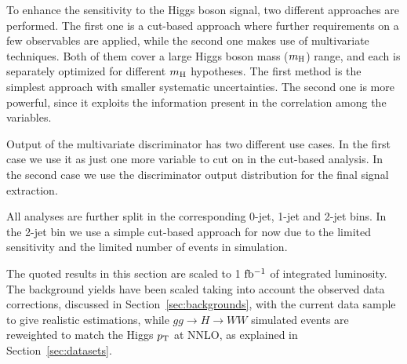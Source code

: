 To enhance the sensitivity to the Higgs boson signal, two different approaches 
are performed. The first one is a cut-based approach where further requirements 
on a few observables are applied, while the second one makes use of
multivariate techniques. Both of them cover a large Higgs boson mass
($m_{\rm{H}}$) range, and each is separately optimized for different
$m_{\rm{H}}$ hypotheses. The first method is the simplest approach with smaller
systematic uncertainties. The second one is
more powerful, since it exploits the information present in the
correlation among the variables. 

Output of the multivariate discriminator has two different use
cases. In the first case we use it as just one more variable to cut on
in the cut-based analysis. In the second case we use the discriminator
output distribution for the final signal extraction.

All analyses are further split in the corresponding 0-jet, 1-jet and
2-jet bins. In the 2-jet bin we use a simple cut-based approach for
now due to the limited sensitivity and the limited number of events in
simulation.

The quoted results in this section are scaled to 1 $\mathrm{fb^{-1}}$ of integrated luminosity. 
The background yields have been scaled taking into account the observed data 
corrections, discussed in Section~\ref{sec:backgrounds}, with the current data 
sample to give realistic estimations, while $gg \to H \to WW$ simulated 
events are reweighted to match the Higgs $p_\mathrm{T}$ at NNLO, as explained in 
Section~\ref{sec:datasets}.
